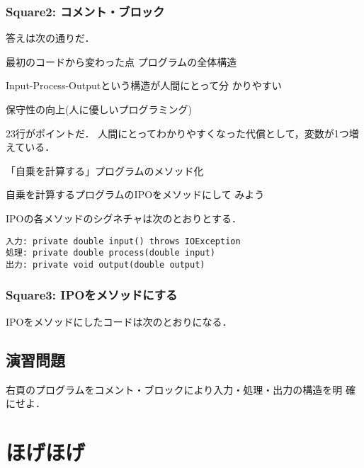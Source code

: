 \documentclass[a4j,papersize]{jsbook}
\begin{document}
\newpage

\newpage


\subsection{Square2: コメント・ブロック}

答えは次の通りだ．

最初のコードから変わった点
プログラムの全体構造

 Input-Process-Outputという構造が人間にとって分
かりやすい

 保守性の向上(人に優しいプログラミング)

23行がポイントだ．
人間にとってわかりやすくなった代償として，変数が1つ増えている．

\begin{例題}
 「自乗を計算する」プログラムのメソッド化

 自乗を計算するプログラムのIPOをメソッドにして
みよう
\end{例題}

IPOの各メソッドのシグネチャは次のとおりとする．

\begin{verbatim}
入力: private double input() throws IOException
処理: private double process(double input)
出力: private void output(double output)
\end{verbatim}

\newpage

\newpage

\subsection{Square3: IPOをメソッドにする}
IPOをメソッドにしたコードは次のとおりになる．

\newpage

\newpage

\section{演習問題}
\begin{演習}
 右頁のプログラムをコメント・ブロックにより入力・処理・出力の構造を明
 確にせよ．
\end{演習}
\newpage

\newpage
\chapter{ほげほげ}
\end{document}

